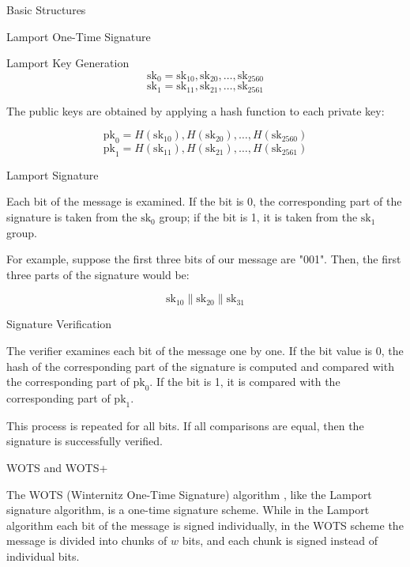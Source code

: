 \begin{section}{Basic Structures}{\label{sec1}}
\begin{subsection}{Lamport One-Time Signature}
\begin{subsubsection}{Lamport Key Generation}
    \[
    \text{sk}_0 = \text{sk}_{10}, \text{sk}_{20}, \ldots, \text{sk}_{2560}
    \]
    \[
    \text{sk}_1 = \text{sk}_{11}, \text{sk}_{21}, \ldots, \text{sk}_{2561}
    \]
    
    The public keys are obtained by applying a hash function to each private key:
    
    \[
    \text{pk}_0 = H(\text{sk}_{10}), H(\text{sk}_{20}), \ldots, H(\text{sk}_{2560})
    \]
    \[
    \text{pk}_1 = H(\text{sk}_{11}), H(\text{sk}_{21}), \ldots, H(\text{sk}_{2561}) \]
    
\end{subsubsection}

\begin{subsubsection}{Lamport Signature}

    Each bit of the message is examined. If the bit is 0, the corresponding part of the signature is taken from the \(\text{sk}_0\) group; if the bit is 1, it is taken from the \(\text{sk}_1\) group.

    For example, suppose the first three bits of our message are "001". Then, the first three parts of the signature would be:

    \[
    \text{sk}_{10} \| \text{sk}_{20} \| \text{sk}_{31}
    \]
    
\end{subsubsection}

\begin{subsubsection}{Signature Verification}

    The verifier examines each bit of the message one by one. If the bit value is 0, the hash of the corresponding part of the signature is computed and compared with the corresponding part of \(\text{pk}_0\). If the bit is 1, it is compared with the corresponding part of \(\text{pk}_1\).

    This process is repeated for all bits. If all comparisons are equal, then the signature is successfully verified.
    
\end{subsubsection}
    
\end{subsection}

\begin{subsection}{WOTS and WOTS+}

    The WOTS (Winternitz One-Time Signature) algorithm \cite{buchmann2013security}, like the Lamport signature algorithm, is a one-time signature scheme. While in the Lamport algorithm each bit of the message is signed individually, in the WOTS scheme the message is divided into chunks of \( w \) bits, and each chunk is signed instead of individual bits. 


\end{subsection}
\end{section}
